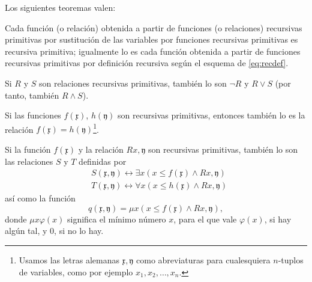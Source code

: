 Los siguientes teoremas valen:

\begin{teorema} \label{teo:TeoremaI}
    Cada función (o relación) obtenida a partir de funciones (o relaciones) recursivas primitivas por sustitución de las variables por funciones recursivas 
    primitivas es recursiva primitiva; igualmente lo es cada función obtenida a partir de funciones recursivas primitivas por definición recursiva según el
    esquema de \eqref{eq:recdef}.
\end{teorema}

\begin{teorema} \label{teo:TeoremaII}
    Si $R$ y $S$ son relaciones recursivas primitivas, también lo son $\lnot R$ y $R \vee S$ (por tanto, también $R \wedge S$).
\end{teorema}

\begin{teorema} \label{teo:TeoremaIII}
    Si las funciones $f(\mathfrak{x})$, $h(\mathfrak{y})$ son recursivas primitivas, entonces también lo es la relación 
    $f(\mathfrak{x}) = h(\mathfrak{y})$\footnote{Usamos las letras alemanas $\mathfrak{x}, \mathfrak{y}$ como abreviaturas para cualesquiera $n$-tuplos de variables, 
    como por ejemplo $x_1, x_2, \dots, x_n$.}.
\end{teorema}

\begin{teorema} \label{teo:TeoremaIV}
    Si la función $f(\mathfrak{x})$ y la relación $Rx, \mathfrak{y}$ son recursivas primitivas, también lo son las relaciones $S$ y $T$ definidas por 
    \begin{equation}
        \begin{aligned}
            &S(\mathfrak{x}, \mathfrak{y}) \leftrightarrow \exists x (x \leq f(\mathfrak{x}) \wedge Rx, \mathfrak{y} ) \\
            &T(\mathfrak{x}, \mathfrak{y}) \leftrightarrow \forall x (x \leq h(\mathfrak{x}) \wedge Rx, \mathfrak{y} )
        \end{aligned}
    \end{equation}
    así como la función
    \begin{equation}
        q(\mathfrak{x}, \mathfrak{y}) = \mu x (x \leq f(\mathfrak{x}) \wedge Rx, \mathfrak{y}),
    \end{equation}
    donde $\mu x \varphi(x)$ significa el mínimo número $x$, para el que vale $\varphi(x)$, si hay algún tal, y $0$, si no lo hay.
\end{teorema}

